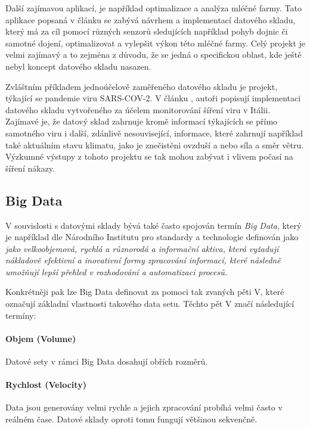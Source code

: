 \documentclass[
  digital,     %
  twoside,     %
  lof,         %
  lot,         %
]{fithesis4}
\begin{document}
Další zajímavou aplikací, je například optimalizace a analýza mléčné farmy. Tato aplikace popsaná v článku  \parencite{Schuetz20180326} se zabývá návrhem a implementací datového skladu, který má za cíl pomocí různých senzorů sledujících například pohyb dojnic či samotné dojení, optimalizovat a vylepšit výkon této mléčné farmy. Celý projekt je velmi zajímavý a to zejména z důvodu, že se jedná o specifickou oblast, kde ještě nebyl koncept datového skladu nasazen.

Zvláštním příkladem jednoúčelově zaměřeného datového skladu je projekt, týkající se pandemie viru SARS-COV-2. V článku  \parencite{Agapito2020}, autoři popisují implementaci datového skladu vytvořeného za účelem monitorování šíření viru v Itálii. Zajímavé je, že datový sklad zahrnuje kromě informací týkajících se přímo samotného viru i další, zdánlivě nesouvisející, informace, které zahrnují například také aktuálním stavu klimatu, jako je znečistěni ovzduší a nebo síla a směr větru. Výzkumné výstupy z tohoto projektu se tak mohou zabývat i vlivem počasí na šíření nákazy. 

\subsection{Big Data}
V souvislosti s datovými sklady bývá také často spojován termín \emph{Big Data}, který je například dle Národního Institutu pro standardy a technologie definován jako \emph{jako velkoobjemová, rychlá a různorodá a informační aktiva, která vyžadují nákladově efektivní a inovativní formy zpracování informací, které následně umožňují lepší přehled v rozhodování a automatizaci procesů.  } \parencite{Gartner} 

Konkrétněji pak lze Big Data definovat za pomoci tak zvaných pěti V, které označují základní vlastnosti takového data setu.  Těchto pět V značí následující termíny: \parencite{big_data}
\paragraph{Objem (Volume) }
Datové sety v rámci Big Data dosahují obřích rozměrů.

\paragraph{Rychlost (Velocity)}
Data jsou generovány velmi rychle a jejich zpracování probíhá velmi často v reálném čase. Datové sklady oproti tomu fungují většinou sekvenčně.
\end{document}
